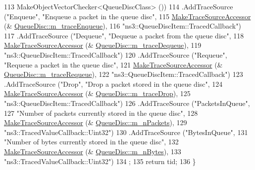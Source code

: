 \begin{DoxyCode}
113                    MakeObjectVectorChecker<QueueDiscClass> ())
114     .AddTraceSource (\textcolor{stringliteral}{"Enqueue"}, \textcolor{stringliteral}{"Enqueue a packet in the queue disc"},
115                      \hyperlink{group__tracing_gab21a770b9855af4e8f69f7531ea4a6b0}{MakeTraceSourceAccessor} (&
      \hyperlink{classns3_1_1QueueDisc_a7614788f662bc6df8c98a646f494dd61}{QueueDisc::m\_traceEnqueue}),
116                      \textcolor{stringliteral}{"ns3::QueueDiscItem::TracedCallback"})
117     .AddTraceSource (\textcolor{stringliteral}{"Dequeue"}, \textcolor{stringliteral}{"Dequeue a packet from the queue disc"},
118                      \hyperlink{group__tracing_gab21a770b9855af4e8f69f7531ea4a6b0}{MakeTraceSourceAccessor} (&
      \hyperlink{classns3_1_1QueueDisc_a1be3a308037b0feb28ae284b9be04bfc}{QueueDisc::m\_traceDequeue}),
119                      \textcolor{stringliteral}{"ns3::QueueDiscItem::TracedCallback"})
120     .AddTraceSource (\textcolor{stringliteral}{"Requeue"}, \textcolor{stringliteral}{"Requeue a packet in the queue disc"},
121                      \hyperlink{group__tracing_gab21a770b9855af4e8f69f7531ea4a6b0}{MakeTraceSourceAccessor} (&
      \hyperlink{classns3_1_1QueueDisc_a599ba8331f01a8b7ff1d690a8c52dedc}{QueueDisc::m\_traceRequeue}),
122                      \textcolor{stringliteral}{"ns3::QueueDiscItem::TracedCallback"})
123     .AddTraceSource (\textcolor{stringliteral}{"Drop"}, \textcolor{stringliteral}{"Drop a packet stored in the queue disc"},
124                      \hyperlink{group__tracing_gab21a770b9855af4e8f69f7531ea4a6b0}{MakeTraceSourceAccessor} (&
      \hyperlink{classns3_1_1QueueDisc_a4d59074e7f6aa601eee90f5cd87d423f}{QueueDisc::m\_traceDrop}),
125                      \textcolor{stringliteral}{"ns3::QueueDiscItem::TracedCallback"})
126     .AddTraceSource (\textcolor{stringliteral}{"PacketsInQueue"},
127                      \textcolor{stringliteral}{"Number of packets currently stored in the queue disc"},
128                      \hyperlink{group__tracing_gab21a770b9855af4e8f69f7531ea4a6b0}{MakeTraceSourceAccessor} (&
      \hyperlink{classns3_1_1QueueDisc_a7afc9edf0fdb517d088ebe8d3747fbef}{QueueDisc::m\_nPackets}),
129                      \textcolor{stringliteral}{"ns3::TracedValueCallback::Uint32"})
130     .AddTraceSource (\textcolor{stringliteral}{"BytesInQueue"},
131                      \textcolor{stringliteral}{"Number of bytes currently stored in the queue disc"},
132                      \hyperlink{group__tracing_gab21a770b9855af4e8f69f7531ea4a6b0}{MakeTraceSourceAccessor} (&
      \hyperlink{classns3_1_1QueueDisc_a5c9e0e5c858f333bb15089eea58a1e3b}{QueueDisc::m\_nBytes}),
133                      \textcolor{stringliteral}{"ns3::TracedValueCallback::Uint32"})
134   ;
135   \textcolor{keywordflow}{return} tid;
136 \}
\end{DoxyCode}


